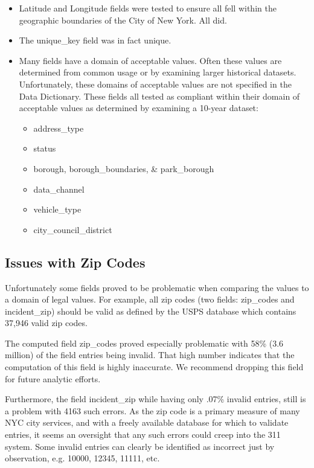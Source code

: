 \documentclass[12pt, titlepage]{article}
\begin{document}
\begin{itemize}
	\item Latitude and Longitude fields were tested to ensure all fell within the geographic boundaries of the City of New York. All did.
	\item The unique\_key field was in fact unique.
	\item Many fields have a domain of acceptable values. Often these values are determined from common usage or by examining
	larger historical datasets. Unfortunately, these domains of acceptable values are not specified in the Data Dictionary. These fields all tested as
	compliant within their domain of acceptable values as determined by examining a 10-year dataset:
		\begin{itemize}
			\item address\_type
			\item status
			\item borough, borough\_boundaries, \& park\_borough 
			\item data\_channel
			\item vehicle\_type
			\item city\_council\_district
		\end{itemize}
\end{itemize}	

	\subsection{Issues with Zip Codes}
	\label{sec:zip-codes}
	 Unfortunately some fields proved to be  problematic when comparing the values to a domain of legal values.
	 For example, all zip codes (two fields: zip\_codes and incident\_zip) should be valid as defined by the USPS database
	 which contains 37,946 valid zip codes.
	 
	The computed field zip\_codes proved especially problematic with 58\% (3.6 million) of the field entries being invalid.
	That high number indicates that the computation of this field is highly inaccurate. We recommend
	dropping this field for future analytic efforts.
	
	Furthermore, the field incident\_zip while having only .07\% invalid entries, still is a problem with 4163 such errors.
	As the zip code is a primary measure of many NYC city services, 
	and with a freely available database for which to validate entries, it seems an oversight 
	that any such errors could creep into the 311 system. Some invalid entries can  
	clearly be identified as incorrect just by observation, e.g. 10000, 12345, 11111, etc. 
	
\end{document}
